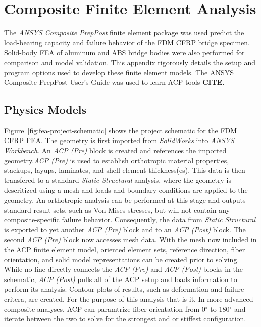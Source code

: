 \section{Composite Finite Element Analysis}

\indent

The \textit{ANSYS Composite PrepPost} finite element package was used predict the load-bearing capacity and failure behavior of the FDM CFRP bridge specimen. Solid-body FEA of aluminum and ABS bridge bodies were also performed for comparison and model validation. This appendix rigorously details the setup and program options used to develop these finite element models. The ANSYS Composite PrepPost User's Guide was used to learn ACP tools \large{\textbf{CITE}}.\\

\subsection{Physics Models}

\indent

Figure~\ref{fig:fea-project-schematic} shows the project schematic for the FDM CFRP FEA. The geometry is first imported from \emph{SolidWorks} into \emph{ANSYS Workbench}. An \textit{ACP (Pre)} block is created and references the imported geometry.\textit{ACP (Pre)} is used to establish orthotropic material properties, stackups, layups, laminates, and shell element thickness(es). This data is then transfered to a standard \textit{Static Structural} analysis, where the geometry is descritized using a mesh and loads and boundary conditions are applied to the geometry. An orthotropic analysis can be performed at this stage and outputs standard result sets, such as Von Mises stresses, but will not contain any composite-specific failure behavior. Consequently, the data from \textit{Static Structural} is exported to yet another \textit{ACP (Pre)} block and to an \textit{ACP (Post)} block. The second \textit{ACP (Pre)} block now accesses mesh data. With the mesh now included in the ACP finite element model, oriented element sets, reference direction, fiber orientation, and solid model representations can be created prior to solving. While no line directly connects the \textit{ACP (Pre)} and \textit{ACP (Post)} blocks in the schematic, \textit{ACP (Post)} pulls all of the ACP setup and loads information to perform its analysis. Contour plots of results, such as deformation and failure critera, are created. For the purpose of this analysis that is it. In more advanced composite analyses, ACP can paramtrize fiber orientation from 0$^{\circ}$ to 180$^{\circ}$ and iterate between the two to solve for the strongest and or stiffest configuration.\\

